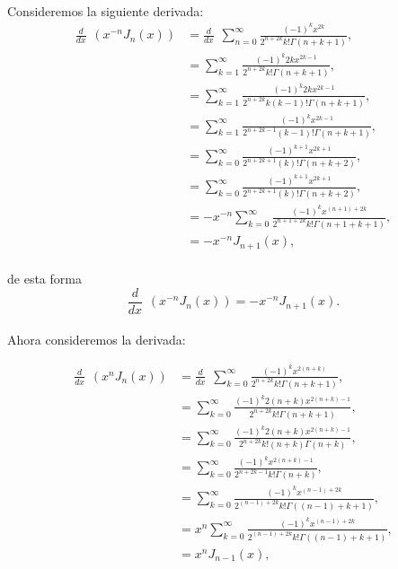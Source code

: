 \documentclass{article}
\begin{document}
\paragraph{} Consideremos la siguiente derivada:
\begin{align*}
 \frac{d}{dx}\hspace{5pt}\left(x^{-n} J_n(x)\right)
&= \frac{d}{dx} \hspace{5pt} \sum_{n=0}^{\infty} \frac{(-1)^k x^{2k}}{2^{n+2k} k! \Gamma(n+k+1)},\\
&= \sum_{k=1}^{\infty}  \frac{(-1)^k 2k x^{2k-1}}{2^{n+2k} k! \Gamma(n+k+1)},\\
&= \sum_{k=1}^{\infty}  \frac{(-1)^k 2k x^{2k-1}}{2^{n+2k} k (k-1)! \Gamma(n+k+1)},\\
&= \sum_{k=1}^{\infty}  \frac{(-1)^k x^{2k-1}}{2^{n + 2k - 1}(k-1)! \Gamma(n+k+1)},\\
&= \sum_{k=0}^{\infty}  \frac{(-1)^{k+1} x^{2k+1}}{2^{n + 2k + 1}(k)!\Gamma(n+k+2)},\\
&= \sum_{k=0}^{\infty}  \frac{(-1)^{k+1} x^{2k+1}}{2^{n + 2k + 1}(k)!\Gamma(n+k+2)},\\
&= -x^{-n} \sum_{k=0}^{\infty} \frac{(-1)^k x^{(n+1)+2k}}{2^{n+1 + 2k} k! \Gamma(n+1+k+1)},\\
&= -x^{-n} J_{n+1}(x),
\end{align*}
\paragraph{}de esta forma 
\begin{equation}
\frac{d}{dx} \hspace{5pt} (x^{-n} J_n(x)) = -x^{-n} J_{n+1}(x)\label{eq:prop_a2}.
\end{equation}
\paragraph{} Ahora consideremos la derivada:

\begin{align*}
\frac{d}{dx} \hspace{5pt} (x^n J_n(x)) 
&= \frac{d}{dx} \hspace{5pt} \sum_{k=0}^{\infty} \frac{(-1)^k x^{2(n+k)}}{2^{n+2k} k! \Gamma(n+k+1)},\\
&= \sum_{k=0}^{\infty} \frac{(-1)^k 2(n+k)x^{2(n+k)-1}}{2^{n+2k} k! \Gamma(n+k+1)},\\
&= \sum_{k=0}^{\infty} \frac{(-1)^k 2(n+k)x^{2(n+k)-1}}{2^{n+2k} k!(n+k) \Gamma(n+k)},\\
&= \sum_{k=0}^{\infty} \frac{(-1)^k x^{2(n+k)-1}}{2^{n+2k-1} k! \Gamma(n+k)},\\
&= \sum_{k=0}^{\infty} \frac{(-1)^k x^{(n-1)+2k}}{2^{(n-1)+2k} k! \Gamma((n-1)+k+1)},\\
&= x^n \sum_{k=0}^{\infty} \frac{(-1)^k x^{(n-1)+2k}}{2^{(n-1)+2k} k! \Gamma((n-1)+ k + 1)},\\
&= x^n J_{n-1}(x),
\end{align*}
\end{document}
